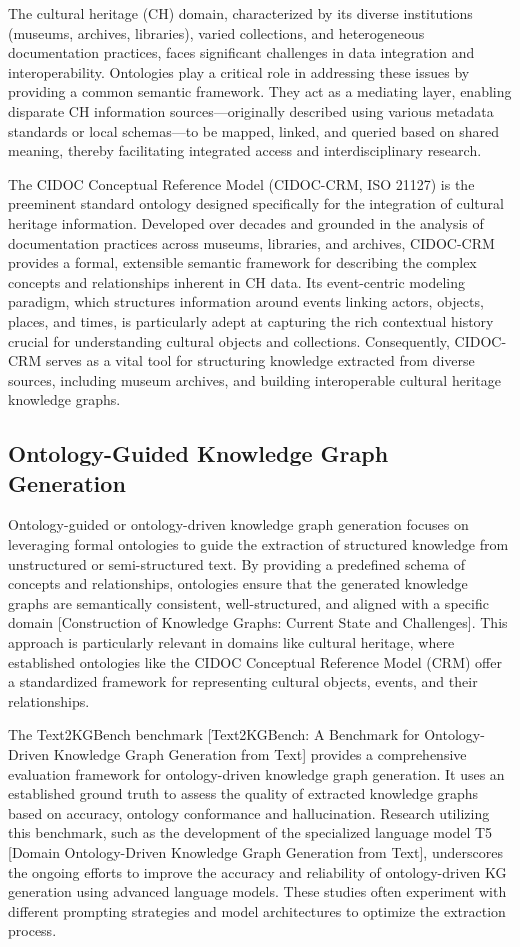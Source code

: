 \documentclass[a4, conference]{IEEEtran}
\begin{document}
The cultural heritage (CH) domain, characterized by its diverse institutions (museums, archives, libraries), varied collections, and heterogeneous documentation practices, faces significant challenges in data integration and interoperability. Ontologies play a critical role in addressing these issues by providing a common semantic framework. They act as a mediating layer, enabling disparate CH information sources—originally described using various metadata standards or local schemas—to be mapped, linked, and queried based on shared meaning, thereby facilitating integrated access and interdisciplinary research.

The CIDOC Conceptual Reference Model (CIDOC-CRM, ISO 21127) is the preeminent standard ontology designed specifically for the integration of cultural heritage information. Developed over decades and grounded in the analysis of documentation practices across museums, libraries, and archives, CIDOC-CRM provides a formal, extensible semantic framework for describing the complex concepts and relationships inherent in CH data. Its event-centric modeling paradigm, which structures information around events linking actors, objects, places, and times, is particularly adept at capturing the rich contextual history crucial for understanding cultural objects and collections. Consequently, CIDOC-CRM serves as a vital tool for structuring knowledge extracted from diverse sources, including museum archives, and building interoperable cultural heritage knowledge graphs.

\subsection{Ontology-Guided Knowledge Graph Generation}

Ontology-guided or ontology-driven knowledge graph generation focuses on leveraging formal ontologies to guide the extraction of structured knowledge from unstructured or semi-structured text. By providing a predefined schema of concepts and relationships, ontologies ensure that the generated knowledge graphs are semantically consistent, well-structured, and aligned with a specific domain [Construction of Knowledge Graphs: Current State and Challenges]. This approach is particularly relevant in domains like cultural heritage, where established ontologies like the CIDOC Conceptual Reference Model (CRM) offer a standardized framework for representing cultural objects, events, and their relationships.

The Text2KGBench benchmark [Text2KGBench: A Benchmark for Ontology-Driven Knowledge Graph Generation from Text] provides a comprehensive evaluation framework for ontology-driven knowledge graph generation. It uses an established ground truth to assess the quality of extracted knowledge graphs based on accuracy, ontology conformance and hallucination. Research utilizing this benchmark, such as the development of the specialized language model T5 [Domain Ontology-Driven Knowledge Graph Generation from Text], underscores the ongoing efforts to improve the accuracy and reliability of ontology-driven KG generation using advanced language models. These studies often experiment with different prompting strategies and model architectures to optimize the extraction process.
\end{document}

